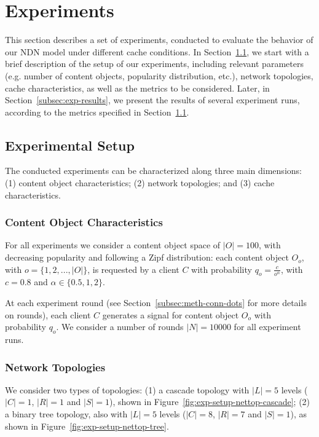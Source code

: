 \section{Experiments}
\label{sec:experiments}

This section describes a set of experiments, conducted to evaluate 
the behavior of our NDN model under different cache conditions. In 
Section~\ref{subsec:exp-setup}, we start 
with a brief description of the setup of our experiments, 
including relevant parameters (e.g. number of content objects, popularity 
distribution, etc.), network topologies, cache characteristics, as well as the 
metrics to be considered. Later, in Section~\ref{subsec:exp-results}, we 
present the results of several experiment runs, according to the metrics 
specified in Section~\ref{subsec:exp-setup}.

\subsection{Experimental Setup}
\label{subsec:exp-setup}

The conducted experiments can be characterized along three main dimensions: (1) 
content object characteristics; (2) network topologies; and (3) cache 
characteristics.\shortvertbreak

\subsubsection{Content Object Characteristics}
\label{subsec:exp-setup-cobj}

For all experiments we consider a content object space of 
$|O| = 100$, with decreasing popularity and following a Zipf distribution: 
each content object $O_o$, with $o = \{1,2,...,|O|\}$, is requested by a client 
$C$ with probability $q_{o} = \frac{c}{o^{\alpha}}$, with $c = 0.8$ and 
$\alpha \in \{0.5, 1, 2\}$.\shortvertbreak

At each experiment round (see Section~\ref{subsec:meth-conn-dots} for more details on 
rounds), each client $C$ generates a signal for content object $O_o$ with 
probability $q_{o}$. We consider a number of rounds 
$|N| = 10000$ for all experiment runs.\shortvertbreak

\subsubsection{Network Topologies}
\label{subsec:exp-setup-nettop}

We consider two types of topologies: (1) a cascade topology with $|L| = 5$ levels 
($|C| = 1$, $|R| = 1$ and $|S| = 1$), shown in Figure~\ref{fig:exp-setup-nettop-cascade}; (2) a binary 
tree topology, also with $|L| = 5$ levels ($|C| = 8$, $|R| = 7$ and $|S| = 1$), as 
shown in Figure~\ref{fig:exp-setup-nettop-tree}.\shortvertbreak

